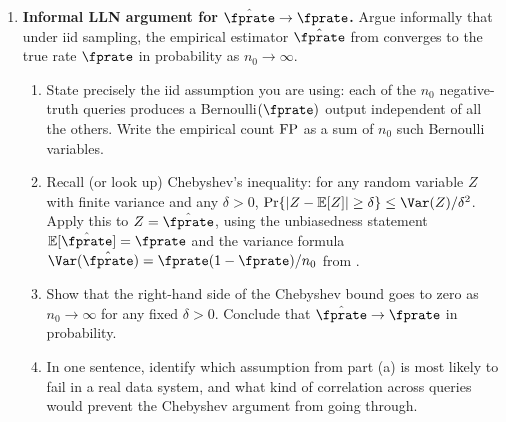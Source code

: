 \begin{enumerate}

\item \exstarstar
\label{ex:ch1-9}
\textbf{Informal LLN argument for $\hat{\fprate} \to \fprate$.}
Argue informally that under iid sampling, the empirical estimator
$\hat{\fprate}$ from  converges to the true
rate $\fprate$ in probability as $n_0 \to \infty$.
\begin{enumerate}
  \item[(a)] State precisely the iid assumption you are using: each of
    the $n_0$ negative-truth queries produces a Bernoulli$(\fprate)$
    output independent of all the others. Write the empirical count
    $\textnormal{FP}$ as a sum of $n_0$ such Bernoulli variables.
  \item[(b)] Recall (or look up) Chebyshev's inequality: for any random
    variable $Z$ with finite variance and any $\delta > 0$,
    $\Pr\{|Z - \mathbb{E}[Z]| \ge \delta\} \le \Var(Z)/\delta^2$.
    Apply this to $Z = \hat{\fprate}$, using the unbiasedness statement
    $\mathbb{E}[\hat{\fprate}] = \fprate$ and the variance formula
    $\Var(\hat{\fprate}) = \fprate(1 - \fprate)/n_0$ from
    .
  \item[(c)] Show that the right-hand side of the Chebyshev bound goes
    to zero as $n_0 \to \infty$ for any fixed $\delta > 0$. Conclude
    that $\hat{\fprate} \to \fprate$ in probability.
  \item[(d)] In one sentence, identify which assumption from part (a)
    is most likely to fail in a real data system, and what kind of
    correlation across queries would prevent the Chebyshev argument
    from going through.
\end{enumerate}


\end{enumerate}
